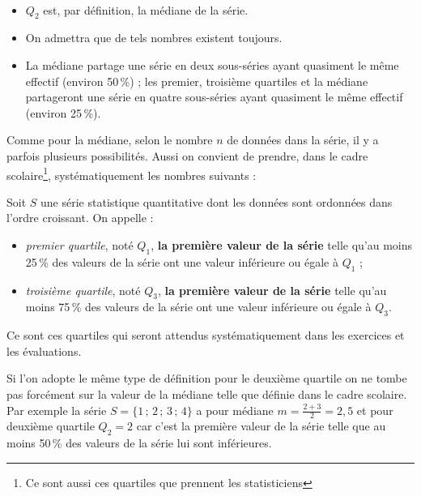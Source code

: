 \begin{rmqs}~
\begin{itemize}
 \item $Q_2$ est, par d\'efinition, la m\'ediane de la s\'erie.
 \item On admettra que de tels nombres existent toujours.
 \item La m\'ediane partage une s\'erie en deux sous-s\'eries ayant quasiment le m\^eme effectif (environ 50\,\%) ; les premier, troisi\`eme quartiles et la m\'ediane partageront une s\'erie en quatre sous-s\'eries ayant quasiment le m\^eme effectif (environ 25\,\%). 
\end{itemize}

 
\end{rmqs}

Comme pour la m\'ediane, selon le nombre $n$ de donn\'ees dans la s\'erie, il y a parfois plusieurs possibilit\'es. Aussi on convient de prendre, dans le cadre scolaire\footnote{Ce sont aussi ces quartiles que prennent les statisticiens}, syst\'ematiquement les nombres suivants :

\begin{definition}
 Soit $S$ une s\'erie statistique quantitative dont les donn\'ees sont ordonn\'ees dans l'ordre croissant. On appelle :
 \begin{itemize}
  \item \emph{premier quartile}, not\'e $Q_1$, \textbf{la premi\`ere valeur de la s\'erie} telle qu'au moins 25\,\% des valeurs de la s\'erie ont une valeur inf\'erieure ou \'egale \`a $Q_1$ ;
  \item \emph{troisi\`eme quartile}, not\'e $Q_3$, \textbf{la premi\`ere valeur de la s\'erie} telle qu'au moins 75\,\% des valeurs de la s\'erie ont une valeur inf\'erieure ou \'egale \`a $Q_3$.
 \end{itemize}
\end{definition}

Ce sont ces quartiles qui seront attendus syst\'ematiquement dans les exercices et les \'evaluations.

\begin{rmq}
 Si l'on adopte le m\^eme type de d\'efinition pour le deuxi\`eme quartile on ne tombe pas forc\'ement sur la valeur de la m\'ediane telle que d\'efinie dans le cadre scolaire.\\ Par exemple la s\'erie $S=\{1\,;\,2\,;\,3\,;\,4\}$ a pour m\'ediane $m=\frac{2+3}{2}=2,5$ et pour deuxi\`eme quartile $Q_2=2$ car c'est la premi\`ere valeur de la s\'erie telle que au moins 50\,\% des valeurs de la s\'erie lui sont inf\'erieures.
\end{rmq}


